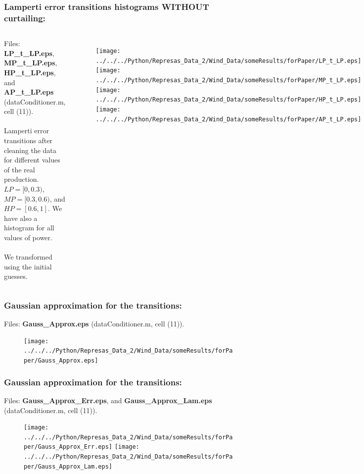 \documentclass[aspectratio=169]{beamer}\usepackage[utf8]{inputenc}
\begin{document}

\begin{frame}\frametitle{Lamperti error transitions histograms WITHOUT curtailing:}

\begin{columns}

Files: \textbf{LP\_t\_LP.eps}, \textbf{MP\_t\_LP.eps}, \textbf{HP\_t\_LP.eps}, and \textbf{AP\_t\_LP.eps} (dataConditioner.m, cell (11)).\\
\quad\\
Lamperti error transitions after cleaning the data for different values of the real production. $LP=[0,0.3)$, $MP=[0.3,0.6)$, and $HP=[0.6,1]$. We have also a histogram for all values of power.\\
\quad\\
We transformed using the initial guesses.

\begin{figure}[ht!]
\centering
\texttt{[image: ../../../Python/Represas\_Data\_2/Wind\_Data/someResults/forPaper/LP\_t\_LP.eps]}
\texttt{[image: ../../../Python/Represas\_Data\_2/Wind\_Data/someResults/forPaper/MP\_t\_LP.eps]}
\texttt{[image: ../../../Python/Represas\_Data\_2/Wind\_Data/someResults/forPaper/HP\_t\_LP.eps]}\texttt{[image: ../../../Python/Represas\_Data\_2/Wind\_Data/someResults/forPaper/AP\_t\_LP.eps]}
\end{figure}

\end{columns}

\end{frame}


\begin{frame}\frametitle{Gaussian approximation for the transitions:}
Files: \textbf{Gauss\_Approx.eps} (dataConditioner.m, cell (11)).
\begin{figure}[ht!]
\centering
\texttt{[image: ../../../Python/Represas\_Data\_2/Wind\_Data/someResults/forPaper/Gauss\_Approx.eps]}
\end{figure}

\end{frame}


\begin{frame}\frametitle{Gaussian approximation for the transitions:}
Files: \textbf{Gauss\_Approx\_Err.eps}, and \textbf{Gauss\_Approx\_Lam.eps} (dataConditioner.m, cell (11)).
\begin{figure}[ht!]
\centering
\texttt{[image: ../../../Python/Represas\_Data\_2/Wind\_Data/someResults/forPaper/Gauss\_Approx\_Err.eps]}
\texttt{[image: ../../../Python/Represas\_Data\_2/Wind\_Data/someResults/forPaper/Gauss\_Approx\_Lam.eps]}
\end{figure}

\end{frame}
\end{document}
